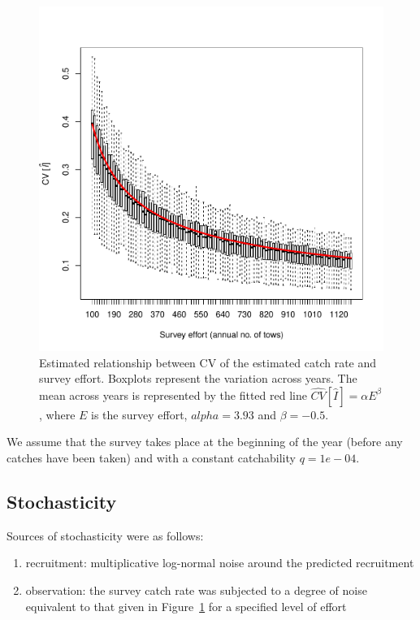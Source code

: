 \documentclass[a4paper]{article}
\begin{document}
\begin{figure}
\centering
\includegraphics{../dat/effCV.pdf}
\caption{Estimated relationship between CV of the estimated catch rate and survey effort. Boxplots represent the variation across years. 
The mean across years is represented by the fitted red line $\hat{CV}[\hat{I}] = \alpha E ^ \beta$, where $E$ is the survey effort,
$alpha=3.93$ and $\beta = -0.5$.}
\label{fig:effCV}
\end{figure} 


We assume that the survey takes place at the beginning of the year (before any catches have been taken)
and with a constant catchability $q=1e-04$. 

\subsection{Stochasticity}


Sources of stochasticity were as follows:
\begin{enumerate}
\item recruitment: multiplicative log-normal noise around the predicted recruitment
\item observation: the survey catch rate was subjected to a degree of noise equivalent to that given in Figure~\ref{fig:effCV}
for a specified level of effort
\end{enumerate}
\end{document}
